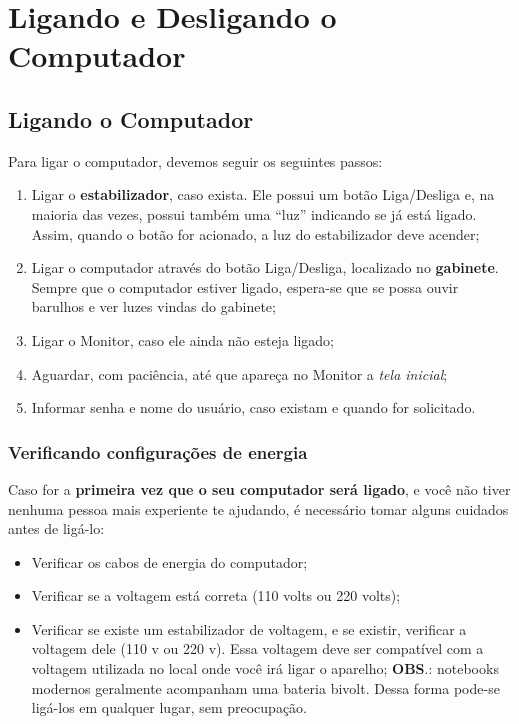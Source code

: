 \documentclass[hidelinks,12pt]{article}
\begin{document}
\section{Ligando e Desligando o Computador}
\label{Ligando e Desligando o Computador}

\subsection{Ligando o Computador}
\label{Ligando o Computador}

	
Para ligar o computador, devemos seguir os seguintes passos:
	
\begin{enumerate}
	\item Ligar o \textbf{estabilizador}, caso exista. Ele possui um botão Liga/Desliga e, na maioria das vezes, possui também uma ``luz'' indicando se já está ligado. Assim, quando o botão for acionado, a luz do estabilizador deve acender;

	\item Ligar o computador através do botão Liga/Desliga, localizado no \textbf{gabinete}. Sempre que o computador estiver ligado, espera-se que se possa ouvir barulhos e ver luzes vindas do gabinete;

    \item Ligar o Monitor, caso ele ainda não esteja ligado;

	\item Aguardar, com paciência, até que apareça no Monitor a \emph{tela inicial};

	\item Informar senha e nome do usuário, caso existam e quando for solicitado.
\end{enumerate}


\subsubsection{Verificando configurações de energia}

Caso for a \textbf{primeira vez que o seu computador será ligado}, e você não tiver nenhuma pessoa mais experiente te ajudando, é necessário tomar alguns cuidados antes de ligá-lo:

\begin{itemize}
    \item Verificar os cabos de energia do computador;
    
    \item Verificar se a voltagem está correta (110 volts ou 220 volts);
    
    \item Verificar se existe um estabilizador de voltagem, e se existir, verificar a voltagem dele (110 v ou 220 v). Essa voltagem deve ser compatível com a voltagem utilizada no local onde você irá ligar o aparelho;
    \textbf{OBS}.: notebooks modernos geralmente acompanham uma bateria bivolt. Dessa forma pode-se ligá-los em qualquer lugar, sem preocupação.
\end{itemize}
\end{document}
